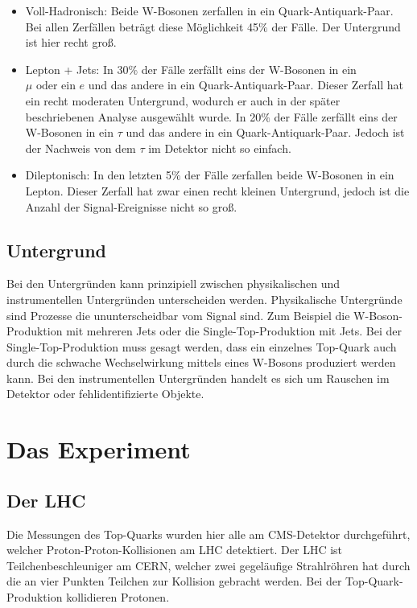 \documentclass[a4paper]{article}
\begin{document}
\begin{itemize}
  \item Voll-Hadronisch: Beide W-Bosonen zerfallen in ein Quark-Antiquark-Paar. Bei allen Zerfällen beträgt diese Möglichkeit 45$\%$ der Fälle. Der Untergrund ist hier recht groß.
  \item Lepton + Jets: In 30$\%$ der Fälle zerfällt eins der W-Bosonen in ein $\mu \textrm{ oder ein } e$ und das andere in ein Quark-Antiquark-Paar. Dieser Zerfall hat ein recht moderaten Untergrund, wodurch er auch in der später beschriebenen Analyse ausgewählt wurde. In 20$\%$ der Fälle zerfällt eins der W-Bosonen in ein $\tau$ und das andere in ein Quark-Antiquark-Paar. Jedoch ist der Nachweis von dem $\tau$ im Detektor nicht so einfach.
  \item Dileptonisch: In den letzten 5$\%$ der Fälle zerfallen beide W-Bosonen in ein Lepton. Dieser Zerfall hat zwar einen recht kleinen Untergrund, jedoch ist die Anzahl der Signal-Ereignisse nicht so groß.
\end{itemize}

\subsection{Untergrund}
Bei den Untergründen kann prinzipiell zwischen physikalischen und instrumentellen Untergründen unterscheiden werden. Physikalische Untergründe sind Prozesse die ununterscheidbar vom Signal sind. Zum Beispiel die W-Boson-Produktion mit mehreren Jets oder die Single-Top-Produktion mit Jets. Bei der Single-Top-Produktion muss gesagt werden, dass ein einzelnes Top-Quark auch durch die schwache Wechselwirkung mittels eines W-Bosons produziert werden kann. Bei den instrumentellen Untergründen handelt es sich um Rauschen im Detektor oder fehlidentifizierte Objekte. 

\section{Das Experiment}
\subsection{Der LHC}
Die Messungen des Top-Quarks wurden hier alle am CMS-Detektor durchgeführt, welcher Proton-Proton-Kollisionen am LHC detektiert. Der LHC ist Teilchenbeschleuniger am CERN, welcher zwei gegeläufige Strahlröhren hat durch die an vier Punkten Teilchen zur Kollision gebracht werden. Bei der Top-Quark-Produktion kollidieren Protonen.
\end{document}
